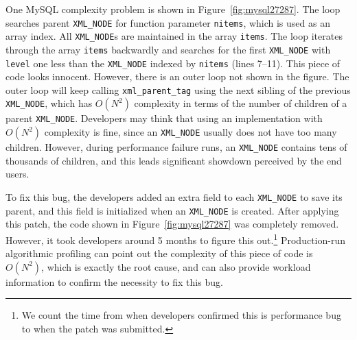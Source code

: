 


One MySQL complexity problem is shown in Figure~\ref{fig:mysql27287}.
The loop searches parent \texttt{XML\_NODE} for function parameter \texttt{nitems},
which is used as an array index. 
All \texttt{XML\_NODE}s are maintained in the array \texttt{items}.
The loop iterates through the array \texttt{items}
backwardly and searches for the first \texttt{XML\_NODE} 
with \texttt{level} one less than the \texttt{XML\_NODE} 
indexed by \texttt{nitems} (lines 7--11).
This piece of code looks innocent.
However, there is an outer loop not shown in the figure.
The outer loop will keep calling \texttt{xml\_parent\_tag} using
the next sibling of the previous \texttt{XML\_NODE},
which has $O(N^2)$ complexity in terms of the number of children of a parent \texttt{XML\_NODE}.
Developers may think that using an implementation with $O(N^2)$ complexity is fine,
since an \texttt{XML\_NODE} usually does not have too many children.
However, during performance failure runs,
an \texttt{XML\_NODE} contains tens of thousands of children,
and this leads significant showdown perceived by the end users.


To fix this bug, the developers added an extra field to each \texttt{XML\_NODE} to save its parent,
and this field is initialized when an \texttt{XML\_NODE} is created.
After applying this patch, the code shown in Figure~\ref{fig:mysql27287} was completely removed.
However, it took developers around 5 months to figure this
out.\footnote{We count the time from when developers confirmed this is performance bug
to when the patch was submitted.}
Production-run algorithmic profiling 
can point out the complexity of this piece of code is $O(N^2)$, 
which is exactly the root cause, 
and can also provide workload information 
to confirm the necessity to fix this bug.


